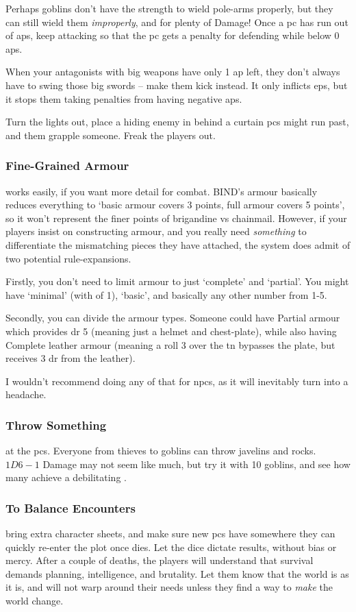 \begin{multicols}{2}
Perhaps goblins don't have the strength to wield pole-arms properly, but they can still wield them \emph{improperly}, and for plenty of Damage!
Once a \gls{pc} has run out of \glspl{ap}, keep attacking so that the \gls{pc} gets a penalty for defending while below 0 \glspl{ap}.

When your antagonists with big weapons have only 1 \gls{ap} left, they don't always have to swing those big swords -- make them kick instead.
It only inflicts \glspl{ep}, but it stops them taking penalties from having negative \glspl{ap}.

Turn the lights out, place a hiding enemy in behind a curtain \glspl{pc} might run past, and them grapple someone.
Freak the players out.

\subsubsection{Fine-Grained Armour}
works easily, if you want more detail for combat.
BIND's armour basically reduces everything to `basic armour covers 3 points, full armour covers 5 points', so it won't represent the finer points of brigandine vs chainmail.
However, if your players insist on constructing armour, and you really need \emph{something} to differentiate the mismatching pieces they have attached, the system does admit of two potential rule-expansions.

Firstly, you don't need to limit armour to just `complete' and `partial'.
You might have `minimal' (with  of 1), `basic', and basically any other number from 1-5.

Secondly, you can divide the armour types.
Someone could have Partial armour which provides \gls{dr} 5 (meaning just a helmet and chest-plate), while also having Complete leather armour (meaning a roll 3 over the \gls{tn} bypasses the plate, but receives 3 \gls{dr} from the leather).

I wouldn't recommend doing any of that for \glspl{npc}, as it will inevitably turn into a headache.

\subsubsection{Throw Something}
at the \glspl{pc}.
Everyone from thieves to goblins can throw javelins and rocks.
$1D6-1$ Damage may not seem like much, but try it with 10 goblins, and see how many achieve a debilitating .

\subsubsection{To Balance Encounters}
bring extra character sheets, and make sure new \glspl{pc} have somewhere they can quickly re-enter the plot once  dies.
Let the dice dictate results, without bias or mercy.
After a couple of deaths, the players will understand that survival demands planning, intelligence, and brutality.
Let them know that the world is as it is, and will not warp around their needs unless they find a way to \emph{make} the world change.


\end{multicols}
